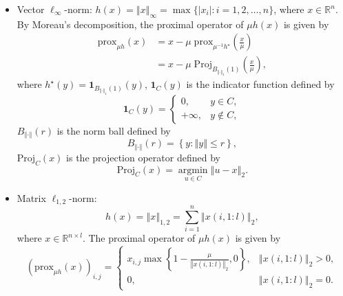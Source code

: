 \documentclass[a4paper]{article}
\newcommand{\norm}[1]{\left\Vert#1\right\Vert}
\newcommand{\mr}{\mathbb{R}}
\newcommand{\prox}{\mathrm{prox}}
\newcommand{\proj}{\mathrm{Proj}}
\newcommand{\mi}{\mathbf{1}}
\begin{document}
\begin{itemize}
    
    \item {Vector $\ell_\infty$-norm:} $h(x) = \norm{x}_\infty = 
    \max\{ |x_i|: i = 1, 2, \ldots, n \}$, where $x \in 
    \mr^n$. By Moreau's decomposition, the proximal operator of $\mu 
    h(x)$ is given by
    \begin{displaymath}
      \begin{split}
        \prox_{\mu h}(x) & = x - \mu \; \prox_{\mu^{-1} h^\star} 
        \left( 
        \frac{x}{\mu} \right) \\
        & = x - \mu \; \proj_{B_{\norm{\cdot}_1}(1)} \left( 
        \frac{x}{\mu} \right),
      \end{split}
    \end{displaymath}
    where $h^\star(y) = \mi_{B_{\norm{\cdot}_1}(1)}(y)$, $\mi_C(y)$ 
    is 
    the indicator function defined by
    \begin{displaymath}
      \mi_C(y) = 
      \begin{cases}
        0, & y \in C, \\
        +\infty, & y \notin C,
      \end{cases}
    \end{displaymath}
    $B_{\norm{\cdot}}(r)$ is the norm ball defined by
    \begin{displaymath}
      B_{\norm{\cdot}}(r) = \left\{ y: \norm{y} \le r \right\},
    \end{displaymath}
    $\proj_C(x)$ is the projection operator defined by
    \begin{displaymath}
      \proj_C(x) = \mathop{\arg\min}\limits_{u \in C} \norm{u - x}_2.
    \end{displaymath}
    
    
    \item {Matrix $\ell_{1,2}$-norm:} $$h(x) = \norm{x}_{1,2} = 
    \sum_{i = 1}^{n} \norm{x(i,1:l)}_2, $$
    where $x \in \mr^{n \times l}$. The proximal operator of $\mu 
    h(x)$ 
    is given by
    \begin{displaymath}
      (\prox_{\mu h}(x))_{i,j} = 
      \begin{cases}
        x_{i,j} \max\left\{ 1 - \frac{\mu}{\norm{x(i,1:l)}_2}, 0 
        \right\}, & \norm{x(i,1:l)}_2 > 0, \\
        0, & \norm{x(i,1:l)}_2 = 0.
      \end{cases}
    \end{displaymath}
    
    
    

\end{itemize}
\end{document}

